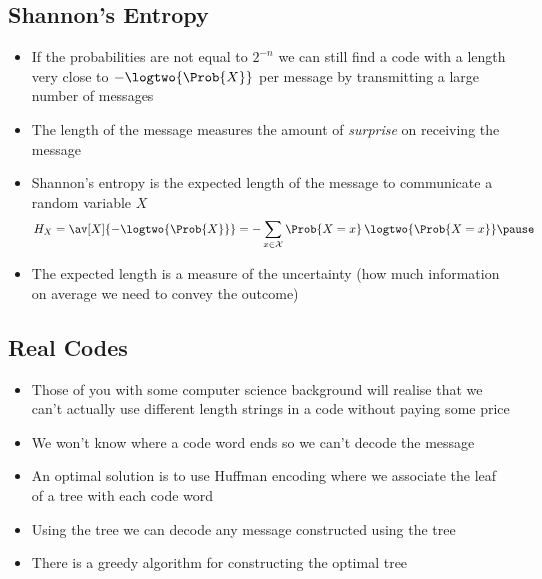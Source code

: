 
\begin{slide}
\section[-1]{Shannon's Entropy}

\begin{PauseHighLight}
  \begin{itemize}
  \item If the probabilities are not equal to $2^{-n}$ we can
    still find a code with a length very close to $-\logtwo{\Prob{X}}$
    per message by transmitting a large number of messages\pause
  \item The length of the message measures the amount of
    \emph{surprise} on receiving the message\pause
  \item Shannon's entropy is the expected length of the message to
    communicate a random variable $X$
    \begin{align*}
      H_X = \av[X]{-\logtwo{\Prob{X}}}
      = - \sum_{x\in\mathcal{X}} \Prob{X=x}\, \logtwo{\Prob{X=x}}\pause
    \end{align*}
  \item The expected length is a measure of the uncertainty\pause{} (how much
    information on average we need to convey the outcome)\pauseb
  \end{itemize}
\end{PauseHighLight}
  

\end{slide}


\begin{slide}
\section[-1]{Real Codes}

\begin{PauseHighLight}
  \begin{itemize}
  \item Those of you with some computer science background will
    realise that we can't actually use different length strings in a
    code without paying some price\pause
  \item We won't know where a code word ends so we can't decode the
    message\pause
  \item An optimal solution is to use Huffman encoding where we
    associate the leaf of a tree with each code word\pause
  \item Using the tree we can decode any message constructed using the
    tree\pause
  \item There is a greedy algorithm for constructing the optimal
    tree\pause
  \end{itemize}
\end{PauseHighLight}

\end{slide}

